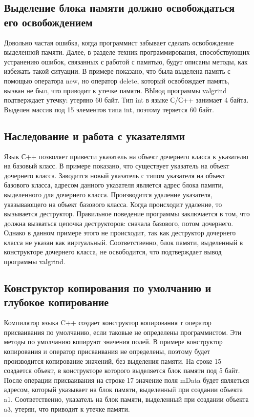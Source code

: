 \documentclass[10pt]{article}
\begin{document}
\subsection{Выделение блока памяти должно освобождаться его освобождением}
Довольно частая ошибка, когда программист забывает сделать освобождение выделенной
памяти. Далее, в разделе техник программирования, способствующих устранению ошибок,
связанных с работой с памятью, будут описаны методы, как избежать такой ситуации.
В примере показано, что была выделена память с помощью оператора new, но оператор
delete, который освобождает память, вызван не был, что приводит к утечке памяти.
ВЫвод программы valgrind подтверждает утечку: утеряно 60 байт. Тип int в языке С/С++
занимает 4 байта. Выделен массив под 15 элементов типа int, поэтому теряется 60 байт.

\subsection{Наследование и работа с указателями}
Язык С++ позволяет привести указатель на объект дочернего класса к указателю на
базовый класс. В примере показано, что существует указатель на объект дочернего класса.
Заводится новый указатель с типом указателя на объект базового класса, адресом данного
указателя является адрес блока памяти, выделенного для дочернего класса. Производится удаление
указателя, указывающего на объект базового класса. Когда происходит удаление, то вызывается деструктор.
Правильное поведение программы заключается в том, что должна вызваться цепочка деструкторов: сначала базового,
потом дочернего. Однако в данном примере этого не происходит, так как деструктор дочернего класса не указан
как виртуальный. Соответственно, блок памяти, выделенный в конструкторе дочернего класса, не освободится,
что подтверждает вывод программы valgrind.

\subsection{Конструктор копирования по умолчанию и глубокое копирование}
Компилятор языка C++ создает конструктор копирования т оператор присваивания по умолчанию, если
таковые не определены программистом. Эти методы по умолчанию копируют значения полей. В примере
конструктор копирования и оператор присваивания не определены, поэтому будет производится копирование
значений, без выделения памяти. На сроке 15 создается объект, в конструкторе которого выделяется
блок памяти под 5 байт. После операции присваивания на строке 17 значение поля mData будет являеться
адресом, который указывает на блок памяти, выделенный при создании объекта a1. Соответственно, указатель
на блок памяти, выделенный при создании объекта a3, утерян, что приводит к утечке памяти.
\end{document}
